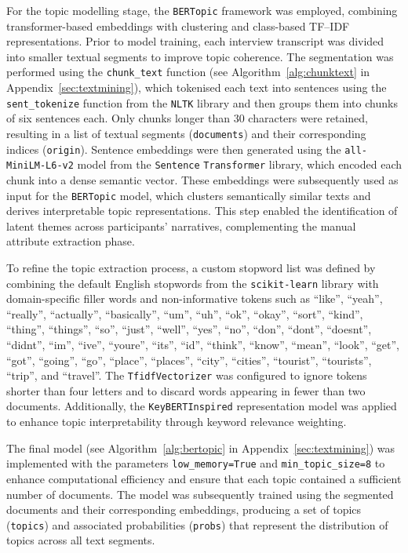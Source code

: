 \documentclass[a4paper, 12pt, twoside]{report}  %
\begin{document}
\indent For the topic modelling stage, the \texttt{BERTopic} framework was employed, combining transformer-based embeddings with clustering and class-based TF–IDF representations. Prior to model training, each interview transcript was divided into smaller textual segments to improve topic coherence. The segmentation was performed using the \texttt{chunk\_text} function (see Algorithm~\ref{alg:chunktext} in Appendix~\ref{sec:textmining}), which tokenised each text into sentences using the \texttt{sent\_tokenize} function from the \texttt{NLTK} library and then groups them into chunks of six sentences each. Only chunks longer than 30 characters were retained, resulting in a list of textual segments (\texttt{documents}) and their corresponding indices (\texttt{origin}). Sentence embeddings were then generated using the \texttt{all-MiniLM-L6-v2} model from the \texttt{Sentence} \texttt{Transformer} library, which encoded each chunk into a dense semantic vector. These embeddings were subsequently used as input for the \texttt{BERTopic} model, which clusters semantically similar texts and derives interpretable topic representations. This step enabled the identification of latent themes across participants’ narratives, complementing the manual attribute extraction phase.

\indent To refine the topic extraction process, a custom stopword list was defined by combining the default English stopwords from the \texttt{scikit-learn} library with domain-specific filler words and non-informative tokens such as ``like”, ``yeah”, ``really”, ``actually”, ``basically”, ``um”, ``uh”, ``ok”, ``okay”, ``sort”, ``kind”, ``thing”, ``things”, ``so”, ``just”, ``well”, ``yes”, ``no”, ``don”, ``dont”, ``doesnt”, ``didnt”, ``im”, ``ive”, ``youre”, ``its”, ``id”, ``think”, ``know”, ``mean”, ``look”, ``get”, ``got”, ``going”, ``go”, ``place”, ``places”, ``city”, ``cities”, ``tourist”, ``tourists”, ``trip”, and ``travel”. The \texttt{TfidfVectorizer} was configured to ignore tokens shorter than four letters and to discard words appearing in fewer than two documents. Additionally, the \texttt{KeyBERTInspired} representation model was applied to enhance topic interpretability through keyword relevance weighting.

\indent The final model (see Algorithm~\ref{alg:bertopic} in Appendix~\ref{sec:textmining}) was implemented with the parameters \texttt{low\_memory=True} and \texttt{min\_topic\_size=8} to enhance computational efficiency and ensure that each topic contained a sufficient number of documents. The model was subsequently trained using the segmented documents and their corresponding embeddings, producing a set of topics (\texttt{topics}) and associated probabilities (\texttt{probs}) that represent the distribution of topics across all text segments.
\end{document}
